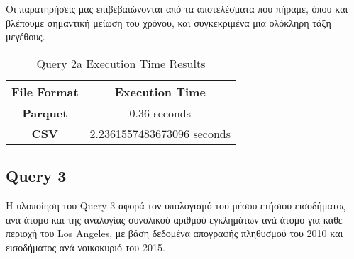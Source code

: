 \documentclass{article}
\begin{document}
Οι παρατηρήσεις μας επιβεβαιώνονται από τα αποτελέσματα που πήραμε, όπου και
βλέπουμε σημαντική μείωση του χρόνου, και συγκεκριμένα μια ολόκληρη τάξη μεγέθους.

\begin{table}[H]
\centering
\caption{Query 2a Execution Time Results}
\label{tab:query2a_execution_times}
\begin{tabular}{|c|c|}
\hline
\textbf{File Format}			& 		\textbf{Execution Time}			\\ \hline
\textbf{Parquet}			&		0.36 seconds						\\ \hline
\textbf{CSV}				&		2.2361557483673096 seconds		\\ \hline
\end{tabular}
\end{table}

\newpage
\subsection {Query 3}


Η υλοποίηση του Query 3 αφορά τον υπολογισμό του μέσου ετήσιου εισοδήματος ανά άτομο και της αναλογίας συνολικού αριθμού εγκλημάτων ανά άτομο για κάθε περιοχή του Los Angeles, με βάση δεδομένα απογραφής πληθυσμού του 2010 και εισοδήματος ανά νοικοκυριό του 2015.
\end{document}

